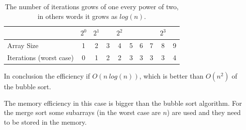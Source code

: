 \begin{table}[H]
\caption[Merge Sort Efficiency.]{The number of iterations grows of one every power of two, in others words it grows as \(log(n)\).}
\label{mergesortefficiency}
\centering
\begin{tabular}{ | l | c | c | c | c | c | c | c | c | c |}
   
    \multicolumn{1}{l}{} & \multicolumn{1}{c}{\(2^{0}\)} & 
    \multicolumn{1}{c}{\(2^{1}\)} & \multicolumn{1}{c}{} &
    \multicolumn{1}{c}{\(2^{2}\)} & \multicolumn{1}{c}{} & 
    \multicolumn{1}{c}{} & \multicolumn{1}{c}{}          & 
    \multicolumn{1}{c}{\(2^{3}\)} & \multicolumn{1}{c}{} \\
    \hline
	Array Size & \cellcolor{LightCyan} 1 & \cellcolor{LightCyan} 2 & 3 & \cellcolor{LightCyan} 4 & 5  & 6 & 7 & \cellcolor{LightCyan} 8 & 9 \\
    \hline
	Iterations (worst case) & \cellcolor{LightCyan} 0 & \cellcolor{LightCyan} 1 & 2 & \cellcolor{LightCyan} 2 & 3 & 3 & 3 & \cellcolor{LightCyan} 3 & 4 \\
	\hline	
\end{tabular}
\end{table}

In conclusion the efficiency if \(O(n \ log(n))\), which is better than \(O(n^{2})\) of the bubble sort. 

The memory efficiency in this case is bigger than the bubble sort algorithm. For the merge sort some subarrays (in the worst case are \(n\)) are used and they need to be stored in the memory.

